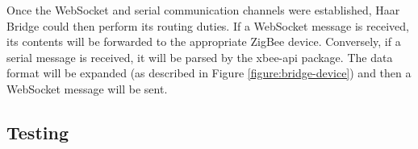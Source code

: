       Once the WebSocket and serial communication channels were established, Haar Bridge could then perform its routing duties. If a WebSocket message is received, its contents will be forwarded to the appropriate ZigBee device. Conversely, if a serial message is received, it will be parsed by the xbee-api package. The data format will be expanded (as described in Figure \ref{figure:bridge-device}) and then a WebSocket message will be sent.

    \subsection{Testing}
